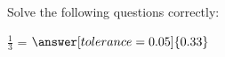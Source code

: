 \documentclass{ximera}
\begin{document}

    \begin{exercise} Solve the following questions correctly:

            $\frac{1}{3}$ =  $\answer[tolerance=0.05]{0.33}$  

    \end{exercise}
\end{document}
